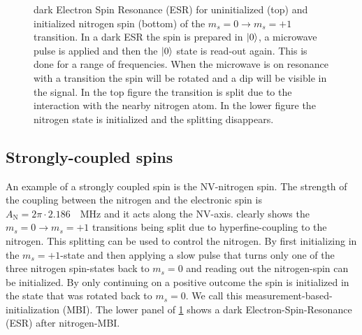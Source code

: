 \begin{figure}[htbp]
\centering
    \caption{dark Electron Spin Resonance (ESR) for uninitialized (top) and initialized nitrogen spin (bottom) of the $m_s =0 \rightarrow m_s = +1$ transition. In a dark ESR the spin is prepared in ${\left\vert{0}\right\rangle}$, a microwave pulse is applied and then the ${\left\vert{0}\right\rangle}$ state is read-out again. This is done for a range of frequencies. When the microwave is on resonance with a transition the spin will be rotated and a dip will be visible in the signal. In the top figure the transition is split due to the interaction with the nearby nitrogen atom. In the lower figure the nitrogen state is initialized and the splitting disappears.}
    \label{fig:HF_split_levels}
\end{figure}

\subsection{Strongly-coupled spins}
An example of a strongly coupled spin is the NV-nitrogen spin.
The strength of the coupling between the nitrogen and the electronic spin is $A_\mathrm{N} = 2\pi \cdot 2.186\quad \mathrm{MHz} $\citep{Bernien2014Control} and it acts along the NV-axis.
 clearly shows the $m_s =0 \rightarrow m_s=+1$ transitions being split due to hyperfine-coupling to the nitrogen.
This splitting can be used to control the nitrogen.
By first initializing in the $m_s =+1$-state and then applying a slow pulse that turns only one of the three nitrogen spin-states back to $m_s=0$ and reading out the nitrogen-spin can be initialized. By only continuing on a positive outcome the spin is initialized in the state that was rotated back to $m_s =0$. We call this measurement-based-initialization (MBI).
The lower panel of \cref{fig:HF_split_levels} shows a dark Electron-Spin-Resonance (ESR) after nitrogen-MBI.

